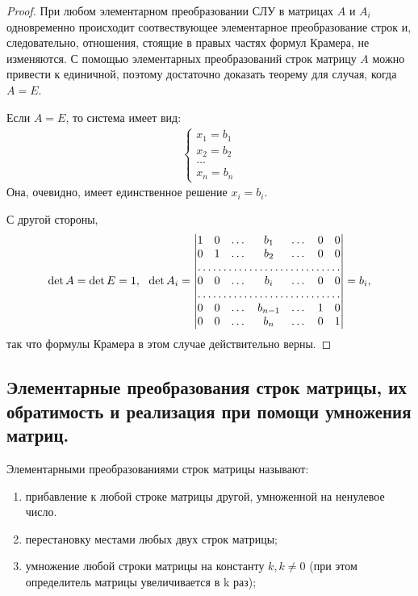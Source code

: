 \documentclass[a4paper, 12pt]{article}
\begin{document}
\begin{proof}
При любом элементарном преобразовании СЛУ в матрицах $A$ и $A_i$ одновременно происходит соотвествующее элементарное преобразование строк и, следовательно, отношения, стоящие в правых частях формул Крамера, не изменяются. С помощью элементарных преобразований строк матрицу $A$ можно привести к единичной, поэтому достаточно доказать теорему для случая, когда $A = E$.

Если $A = E$, то система имеет вид:
\begin{gather*}
\begin{cases*}
x_1 = b_1 \\
x_2 = b_2 \\
\dots \\
x_n = b_n
\end{cases*}
\end{gather*}
Она, очевидно, имеет единственное решение $x_i = b_i$.

С другой стороны,
\begin{gather*}
\det A = \det E = 1,\ \ \det A_i = 
\begin{vmatrix*}
1 & 0 & \dots & b_1 & \dots & 0 & 0\\
0 & 1 & \dots & b_2 & \dots & 0 & 0\\
\hdotsfor{7} \\
0 & 0 & \dots & b_i & \dots & 0 & 0 \\
\hdotsfor{7} \\
0 & 0 & \dots & b_{n-1} & \dots & 1 & 0 \\
0 & 0 & \dots & b_n & \dots & 0 & 1
\end{vmatrix*} = b_i,
\end{gather*}
так что формулы Крамера в этом случае действительно верны.
\end{proof}

\subsection{Элементарные преобразования строк матрицы, их обратимость и реализация при помощи умножения матриц.}
Элементарными преобразованиями строк матрицы называют:

\begin{enumerate}
    \item
        прибавление к любой строке матрицы другой, умноженной на ненулевое число.
    \item
        перестановку местами любых двух строк матрицы;
    \item
        умножение любой строки матрицы на константу $k, k \neq 0$ (при этом определитель матрицы увеличивается в k раз);
\end{enumerate}
\end{document}
